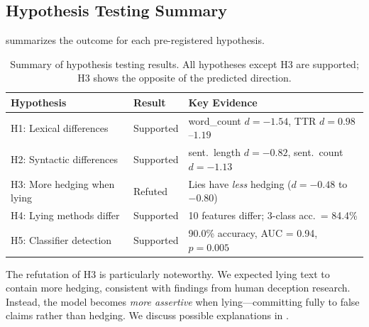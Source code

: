 \subsection{Hypothesis Testing Summary}
\label{sec:hypothesis}

 summarizes the outcome for each pre-registered hypothesis.

\begin{table}[t]
    \centering
    \caption{Summary of hypothesis testing results. All hypotheses except H3 are supported; H3 shows the opposite of the predicted direction.}
    \begin{tabular}{@{}lll@{}}
        \toprule
        \textbf{Hypothesis} & \textbf{Result} & \textbf{Key Evidence} \\
        \midrule
        H1: Lexical differences & Supported & word\_count $d = -1.54$, TTR $d = 0.98$--$1.19$ \\
        H2: Syntactic differences & Supported & sent.\ length $d = -0.82$, sent.\ count $d = -1.13$ \\
        H3: More hedging when lying & Refuted & Lies have \emph{less} hedging ($d = -0.48$ to $-0.80$) \\
        H4: Lying methods differ & Supported & 10 features differ; 3-class acc.\ = 84.4\% \\
        H5: Classifier detection & Supported & 90.0\% accuracy, AUC = 0.94, $p = 0.005$ \\
        \bottomrule
    \end{tabular}
    \label{tab:hypotheses}
\end{table}

The refutation of H3 is particularly noteworthy.
We expected lying text to contain more hedging, consistent with findings from human deception research.
Instead, the model becomes \emph{more assertive} when lying---committing fully to false claims rather than hedging.
We discuss possible explanations in .
